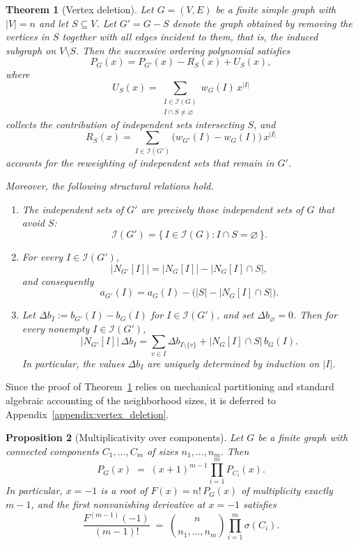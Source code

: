 \documentclass[11pt,a4paper]{article}
\numberwithin{equation}{section}
\theoremstyle{plain}
\newtheorem{theorem}{Theorem}[section]
\newtheorem{proposition}[theorem]{Proposition}
\theoremstyle{definition}
\theoremstyle{remark}
\begin{document}
\begin{theorem}[Vertex deletion]
\label{thm:vertex_set_deletion}
Let $G=(V,E)$ be a finite simple graph with $|V|=n$ and let $S\subseteq V$.
Let \(G' = G-S\) denote the graph obtained by removing the vertices in $S$ together with all edges incident to them, that is, the induced subgraph on $V\setminus S$.
Then the successive ordering polynomial satisfies
\begin{equation}
\label{eq:multi_vertex_poly_decomp}
P_G(x)
=
P_{G'}(x)
-
R_S(x)
+
U_S(x),
\end{equation}
where
\[
U_S(x)
=
\sum_{\substack{I\in\mathcal I(G)\\ I\cap S\neq\varnothing}}
w_G(I)\,x^{|I|}
\]
collects the contribution of independent sets intersecting $S$, and
\[
R_S(x)
=
\sum_{I\in\mathcal I(G')}
\bigl(w_{G'}(I)-w_G(I)\bigr)\,x^{|I|}
\]
accounts for the reweighting of independent sets that remain in $G'$.

Moreover, the following structural relations hold.

\begin{enumerate}
\item[(i)]
The independent sets of $G'$ are precisely those independent sets of $G$
that avoid $S$:
\[
\mathcal I(G')
=
\{\, I\in \mathcal I(G) : I\cap S=\varnothing \,\}.
\]

\item[(ii)]
For every $I\in\mathcal I(G')$,
\[
|N_{G'}[I]|
=
|N_G[I]| - |N_G[I]\cap S|,
\]
and consequently
\[
a_{G'}(I)
=
a_G(I)
-
\bigl(|S| - |N_G[I]\cap S|\bigr).
\]

\item[(iii)]
Let $\Delta b_I := b_{G'}(I)-b_G(I)$ for
$I\in\mathcal I(G')$, and set $\Delta b_{\varnothing}=0$.
Then for every nonempty $I\in\mathcal I(G')$,
\begin{equation}
\label{eq:multi_delta_b}
|N_{G'}[I]|\,\Delta b_I
=
\sum_{v\in I}\Delta b_{I\setminus\{v\}}
+
|N_G[I]\cap S|\, b_G(I).
\end{equation}
In particular, the values $\Delta b_I$ are uniquely determined by
induction on $|I|$.
\end{enumerate}
\end{theorem}

Since the proof of Theorem~\ref{thm:vertex_set_deletion} relies on mechanical partitioning and standard algebraic accounting of the neighborhood sizes, it is deferred to Appendix~\ref{appendix:vertex_deletion}.

\begin{proposition}[Multiplicativity over components]\label{prop:components}
Let \(G\) be a finite graph with connected components \(C_1,\dots,C_m\) of sizes
\(n_1,\dots,n_m\). Then
\[
P_G(x)\;=\;(x+1)^{m-1}\prod_{i=1}^{m}P_{C_i}(x).
\]
In particular, \(x=-1\) is a root of \(F(x)=n!\,P_G(x)\) of multiplicity exactly
\(m-1\), and the first nonvanishing derivative at \(x=-1\) satisfies
\[
\frac{F^{(m-1)}(-1)}{(m-1)!}
\;=\;
\binom{n}{n_1,\dots,n_m}\prod_{i=1}^{m}\sigma(C_i).
\]
\end{proposition}
\end{document}
